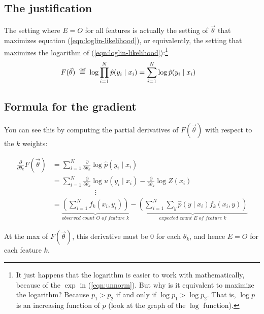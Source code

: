 \documentclass[11pt]{article}
\newcommand{\defeq}{\;\stackrel{\mbox{\tiny def}}{=}\;}
\newcommand{\vtheta}{\vec{\theta}}
\newcommand{\ph}{\hat{p}}
\newcommand{\diffk}{\frac{\partial}{\partial \theta_k}}
\begin{document}
\subsection{The justification}

The setting where $E=O$ for all features is actually the
setting of $\vtheta$ that maximizes equation
(\ref{eqn:loglin-likelihood}), or equivalently, the setting that
maximizes the logarithm of (\ref{eqn:loglin-likelihood}):\footnote{It
  just happens that the logarithm is easier to work with
  mathematically, because of the $\exp$ in (\ref{eqn:unnorm}).  But
  why is it equivalent to maximize the logarithm?  Because $p_1 > p_2$
  if and only if $\log p_1 > \log p_2$.  That is, $\log p$ is
  an increasing function of $p$ (look at the graph of the $\log$ function).%
}
\begin{align}
  F(\vtheta) & \defeq \log \prod_{i=1}^N \ph(y_i \mid x_i) = \sum_{i=1}^N \log \ph(y_i \mid x_i)
\label{eqn:loglin-log-likelihood}
\end{align}

\subsection{Formula for the gradient}

You can see this by computing the partial derivatives of $F(\vtheta)$
with respect to the $k$ weights:

\begin{align}
  \diffk F(\vtheta)
  &= \sum_{i=1}^N \diffk \log \ph(y_i \mid x_i)  \\ %
  &= \sum_{i=1}^N \diffk \log u(y_i \mid x_i) - \diffk \log Z(x_i) \\
  & \hspace{1in}\vdots \nonumber \\
  &= \underbrace{\left( \sum_{i=1}^N f_k(x_i,y_i) \right)}_{\textit{observed count $O$ of feature $k$}}
  - \underbrace{\left( \sum_{i=1}^N \sum_y \ph(y\mid x_i) f_k(x_i,y) \right)}_{\textit{expected count $E$ of feature $k$}} \label{eqn:obsexp}
\end{align}

At the max of $F(\vtheta)$, this derivative must be 0 for each
$\theta_k$, and hence $E=O$ for each feature $k$.
\end{document}
